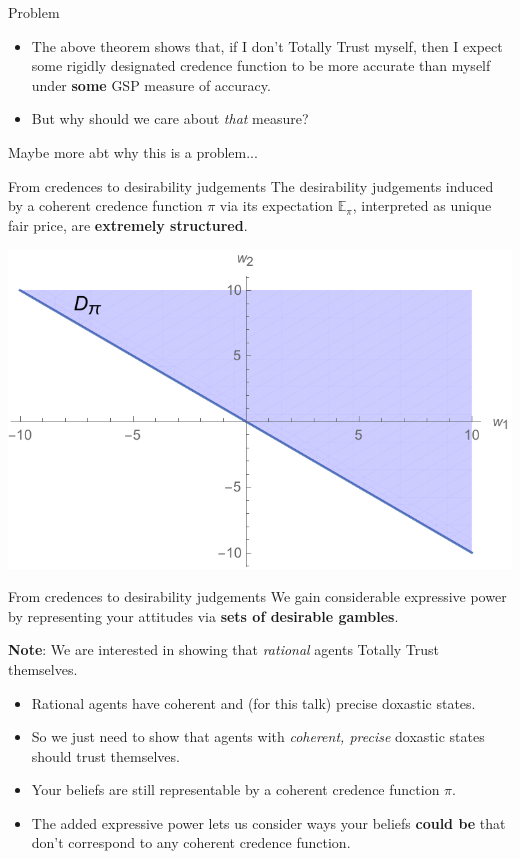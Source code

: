 \documentclass[aspectratio=169, dvipsnames]{beamer}
\newcommand{\E}{\mathbb{E}}
\begin{document}
\begin{frame}{Problem}
  \begin{itemize}
  \item The above theorem shows that, if I don't Totally Trust myself, then I expect some rigidly designated credence function
    to be more accurate than myself under \alert{\textbf{some}} GSP measure of accuracy.
  \item But why should we care about \textit{that} measure?
  \end{itemize}
\end{frame}

\begin{frame}
  Maybe more abt why this is a problem...
\end{frame}

\begin{frame}{From credences to desirability judgements}
  The desirability judgements induced by a coherent credence function $\pi$ via its expectation $\E_{\pi}$, interpreted as unique
  fair price, are \textbf{extremely structured}.
  \begin{center}
      \includegraphics[width=.7\textwidth]{desirability1.pdf}
  \end{center}
\end{frame}

\begin{frame}{From credences to desirability judgements}
  We gain considerable expressive power by representing your attitudes via \alert{\textbf{sets of desirable gambles}}.

  \textbf{Note}: We are interested in showing that \textit{rational} agents Totally Trust themselves.
  \begin{itemize}
    \item Rational agents have coherent and (for this talk) precise doxastic states.
    \item So we just need to show that agents with \textit{coherent, precise} doxastic states should trust themselves. 
    \item Your beliefs are still representable by a coherent credence function $\pi$.
    \item The added expressive power lets us consider ways your beliefs \textbf{\alert{could be}}
      that don't correspond to any coherent credence function.
  \end{itemize}
\end{frame}
\end{document}

